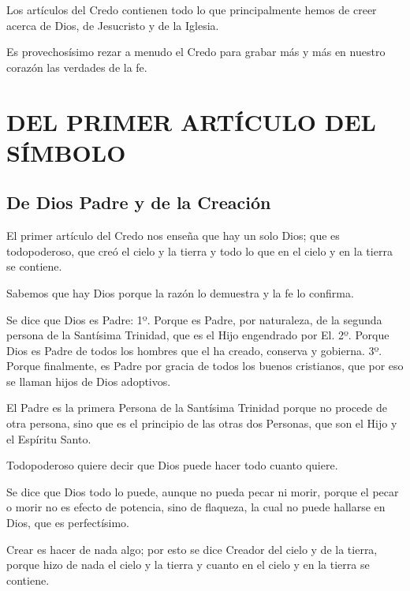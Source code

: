  Los artículos del Credo contienen todo lo que principalmente hemos de creer acerca de Dios, de Jesucristo y de la Iglesia.

 Es provechosísimo rezar a menudo el Credo para grabar más y más en nuestro corazón las verdades de la fe.

\section{DEL PRIMER ARTÍCULO DEL SÍMBOLO}
\setcounter{sub}{1}
\subsection{De Dios Padre y de la Creación}

 El primer artículo del Credo nos enseña que hay un solo Dios; que es todopoderoso, que creó el cielo y la tierra y todo lo que en el cielo y en la tierra se contiene.

 Sabemos que hay Dios porque la razón lo demuestra y la fe lo confirma.

 Se dice que Dios es Padre: 1º. Porque es Padre, por naturaleza, de la segunda persona de la Santísima Trinidad, que es el Hijo engendrado por El. 2º. Porque Dios es Padre de todos los hombres que el ha creado, conserva y gobierna. 3º. Porque finalmente, es Padre por gracia de todos los buenos cristianos, que por eso se llaman hijos de Dios adoptivos.

 El Padre es la primera Persona de la Santísima Trinidad porque no procede de otra persona, sino que es el principio de las otras dos Personas, que son el Hijo y el Espíritu Santo.

 Todopoderoso quiere decir que Dios puede hacer todo cuanto quiere.

 Se dice que Dios todo lo puede, aunque no pueda pecar ni morir, porque el pecar o morir no es efecto de potencia, sino de flaqueza, la cual no puede hallarse en Dios, que es perfectísimo.

 Crear es hacer de nada algo; por esto se dice Creador del cielo y de la tierra, porque hizo de nada el cielo y la tierra y cuanto en el cielo y en la tierra se contiene.

